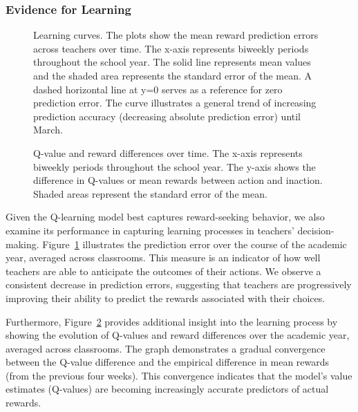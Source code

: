 \documentclass[
  number,
  preprint,
  3p,
  onecolumn]{elsarticle}
\begin{document}
\subsubsection{Evidence for Learning}\label{evidence-for-learning}

\begin{figure}


\caption{\label{fig-prediction-errors}Learning curves. The plots show
the mean reward prediction errors across teachers over time. The x-axis
represents biweekly periods throughout the school year. The solid line
represents mean values and the shaded area represents the standard error
of the mean. A dashed horizontal line at y=0 serves as a reference for
zero prediction error. The curve illustrates a general trend of
increasing prediction accuracy (decreasing absolute prediction error)
until March.}

\end{figure}%

\begin{figure}


\caption{\label{fig-q-value-reward-diff}Q-value and reward differences
over time. The x-axis represents biweekly periods throughout the school
year. The y-axis shows the difference in Q-values or mean rewards
between action and inaction. Shaded areas represent the standard error
of the mean.}

\end{figure}%

Given the Q-learning model best captures reward-seeking behavior, we
also examine its performance in capturing learning processes in
teachers' decision-making. Figure~\ref{fig-prediction-errors}
illustrates the prediction error over the course of the academic year,
averaged across classrooms. This measure is an indicator of how well
teachers are able to anticipate the outcomes of their actions. We
observe a consistent decrease in prediction errors, suggesting that
teachers are progressively improving their ability to predict the
rewards associated with their choices.

Furthermore, Figure~\ref{fig-q-value-reward-diff} provides additional
insight into the learning process by showing the evolution of Q-values
and reward differences over the academic year, averaged across
classrooms. The graph demonstrates a gradual convergence between the
Q-value difference and the empirical difference in mean rewards (from
the previous four weeks). This convergence indicates that the model's
value estimates (Q-values) are becoming increasingly accurate predictors
of actual rewards.
\end{document}
